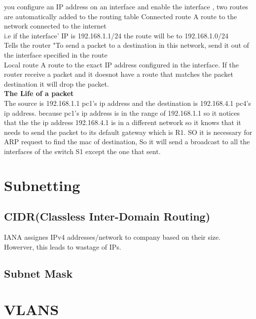 \documentclass{report}
\begin{document}
	you configure an IP address on an interface and enable the interface , two routes
	are automatically added to the routing table Connected route A route to the network
	connected to the internet\\ i.e if the interface' IP is 192.168.1.1/24 the route
	will be to 192.168.1.0/24\\ Tells the router "To send a packet to a destination
	in this network, send it out of the interface specified in the route\\ Local route
	A route to the exact IP address configured in the interface. If the router
	receive a packet and it doesnot have a route that matches the packet
	destination it will drop the packet.\\ \textbf{The Life of a packet} \\ The source
	is 192.168.1.1 pc1's ip address and the destination is 192.168.4.1 pc4's ip address.
	because pc1's ip address is in the range of 192.168.1.1 so it notices that the
	the ip address 192.168.4.1 is in a different network so it knows that it needs
	to send the packet to its default gateway which is R1. SO it is necessary for ARP
	request to find the mac of destination, So it will send a broadcast to all the
	interfaces of the switch S1 except the one that sent.

	\chapter{Subnetting}
	\section{CIDR(Classless Inter-Domain Routing)}
	IANA assignes IPv4 addresses/network to company based on their size. Howerver,
	this leads to wastage of IPs.
	\section{Subnet Mask}

	\chapter{VLANS}
\end{document}
